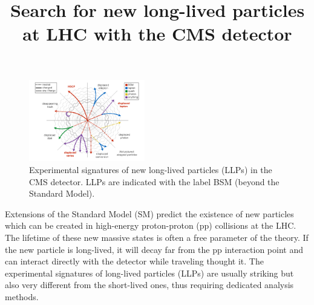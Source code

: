 \documentclass[twocolumn,twoside,10pt,nodate]{article}
\newcommand{\titolo}[2]{\title{\Large\bf\vspace{-1cm}#1}}
\begin{document}

\titolo{Search for new long-lived particles at LHC with the CMS detector}

\date{}%
\maketitle
\thispagestyle{fancy} %

\begin{figure}[h]
\centering
\includegraphics[width=0.45\textwidth,angle=0]{santanastasio_fig1.pdf}
\caption{\small Experimental signatures of new long-lived particles (LLPs) 
in the CMS detector. LLPs are indicated with the label BSM (beyond the Standard Model).} %
\end{figure}

Extensions of the Standard Model (SM) predict the existence of new
particles which can be created in high-energy proton-proton (pp) 
collisions at the LHC. The lifetime of these new massive states is
often a free parameter of the theory. 
If the new particle is long-lived, it will decay far from the pp
interaction point and can interact directly with the detector while
traveling thought it. The experimental signatures of long-lived
particles (LLPs) are usually striking but also very different from 
the short-lived ones, thus requiring dedicated analysis methods.
\end{document}
